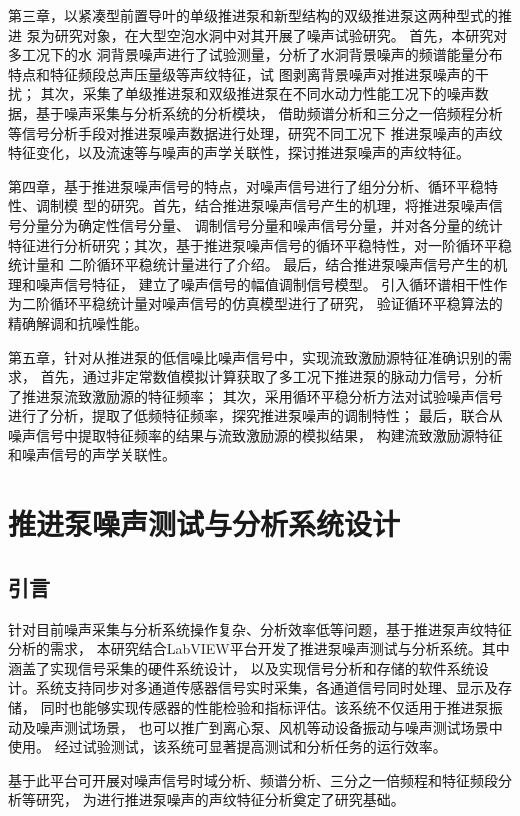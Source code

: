 第三章，以紧凑型前置导叶的单级推进泵和新型结构的双级推进泵这两种型式的推进
泵为研究对象，在大型空泡水洞中对其开展了噪声试验研究。
首先，本研究对多工况下的水
洞背景噪声进行了试验测量，分析了水洞背景噪声的频谱能量分布特点和特征频段总声压量级等声纹特征，试
图剥离背景噪声对推进泵噪声的干扰；
其次，采集了单级推进泵和双级推进泵在不同水动力性能工况下的噪声数据，基于噪声采集与分析系统的分析模块，
借助频谱分析和三分之一倍频程分析等信号分析手段对推进泵噪声数据进行处理，研究不同工况下
推进泵噪声的声纹特征变化，以及流速等与噪声的声学关联性，探讨推进泵噪声的声纹特征。

第四章，基于推进泵噪声信号的特点，对噪声信号进行了组分分析、循环平稳特性、调制模
型的研究。首先，结合推进泵噪声信号产生的机理，将推进泵噪声信号分量分为确定性信号分量、
调制信号分量和噪声信号分量，并对各分量的统计
特征进行分析研究；其次，基于推进泵噪声信号的循环平稳特性，对一阶循环平稳统计量和
二阶循环平稳统计量进行了介绍。
最后，结合推进泵噪声信号产生的机理和噪声信号特征，
建立了噪声信号的幅值调制信号模型。
引入循环谱相干性作为二阶循环平稳统计量对噪声信号的仿真模型进行了研究，
验证循环平稳算法的精确解调和抗噪性能。

第五章，针对从推进泵的低信噪比噪声信号中，实现流致激励源特征准确识别的需求，
首先，通过非定常数值模拟计算获取了多工况下推进泵的脉动力信号，分析了推进泵流致激励源的特征频率；
其次，采用循环平稳分析方法对试验噪声信号进行了分析，提取了低频特征频率，探究推进泵噪声的调制特性；
最后，联合从噪声信号中提取特征频率的结果与流致激励源的模拟结果，
构建流致激励源特征和噪声信号的声学关联性。

\chapter{推进泵噪声测试与分析系统设计}
\section{引言}
针对目前噪声采集与分析系统操作复杂、分析效率低等问题，基于推进泵声纹特征分析的需求，
本研究结合LabVIEW平台开发了推进泵噪声测试与分析系统。其中涵盖了实现信号采集的硬件系统设计，
以及实现信号分析和存储的软件系统设计。系统支持同步对多通道传感器信号实时采集，各通道信号同时处理、显示及存储，
同时也能够实现传感器的性能检验和指标评估。该系统不仅适用于推进泵振动及噪声测试场景，
也可以推广到离心泵、风机等动设备振动与噪声测试场景中使用。
经过试验测试，该系统可显著提高测试和分析任务的运行效率。

基于此平台可开展对噪声信号时域分析、频谱分析、三分之一倍频程和特征频段分析等研究，
为进行推进泵噪声的声纹特征分析奠定了研究基础。
